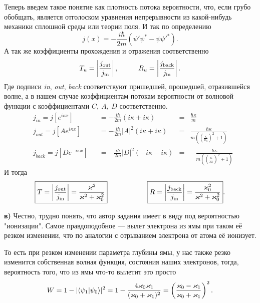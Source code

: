 Теперь введем такое понятие как плотность потока вероятности, что, если грубо обобщать, является отголоском уравнения непрерывности из какой-нибудь механики сплошной среды или теории поля. И так по определению
\begin{equation*}
	j(x) = -\frac{i \hbar}{2 m} (\psi' \psi^* - \psi \psi'^*).
\end{equation*}
А так же коэффициенты прохождения и отражения соответственно
\begin{equation*}
	T_u = \left| \frac{j_\text{out}}{j_\text{in}}\right|,
	\hspace{1 cm}
	R_u = \left| \frac{j_\text{back}}{j_\text{in}}\right|.
\end{equation*}
Где подписи \textit{in}, \textit{out}, \textit{back} соответствуют пришедшей, прошедшей, отразившейся волне, а в нашем случае коэффициентам потокам вероятности от волновой функции с коэффициентами $C,\ A, \ D$ соответственно.
\begin{equation*}
	\begin{aligned}
		&j_\textit{in} = j [e^{i \kappa x}]& &= - \frac{i \hbar}{2 m}(i \kappa + i \kappa) &=& \frac{\hbar \kappa}{m}\\
		&j_\textit{out} = j [A e^{i \kappa x}]& &= - \frac{i \hbar}{2 m}|A|^2(i \kappa + i \kappa) &=& \frac{\hbar \kappa}{m\left(\left(\frac{\kappa}{\kappa_0}\right)^2 + 1\right)}\\
		&j_\textit{back} = j [D e^{-i \kappa x}]& &= - \frac{i \hbar}{2 m} |D|^2( -i \kappa - i \kappa) &=& -\frac{\hbar \kappa}{m\left(\left(\frac{\kappa}{\kappa_0}\right)^2 + 1\right)}
	\end{aligned}
\end{equation*}
И тогда
\begin{equation*}
	\boxed{T = \left|\frac{j_\text{out}}{j_\text{in}}\right| = \frac{\kappa^2}{\kappa^2 + \kappa_0^2}}
	\hspace{2 cm}
	\boxed{R = \left|\frac{j_\text{back}}{j_\text{in}}\right| = \frac{\kappa_0^2}{\kappa^2 + \kappa_0^2}}.
\end{equation*}


\phantom{42}

\textbf{в)} Честно, трудно понять, что автор задания имеет в виду под вероятностью "ионизации". Самое правдоподобное --- вылет электрона из ямы при таком её резком изменении, что по аналогии с отрыванием электрона от атома её ионизует. 

То есть при резком изменении параметра глубины ямы, у нас также резко изменится собственная волная функция, состояния наших электронов, тогда, вероятность того, что из ямы что-то вылетит это просто
\begin{equation*}
	W = 1 - |\bk{\psi_1}{\psi_0}|^2 = 1 - \frac{4 \kappa_0 \kappa_1}{(\kappa_0 + \kappa_1)^2} = \left(\frac{\kappa_0 - \kappa_1}{\kappa_0 + \kappa_1}\right)^2.
\end{equation*}

